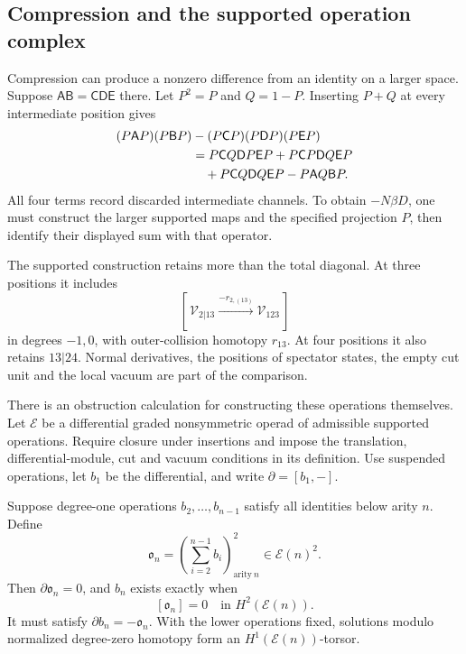 \subsection{Compression and the supported operation complex}
\label{v4-arith:asi:compression}

Compression can produce a nonzero difference from an identity on
a larger space. Suppose
\(\mathsf A\mathsf B=\mathsf C\mathsf D\mathsf E\) there.
Let \(P^2=P\) and \(Q=1-P\). Inserting \(P+Q\) at every
intermediate position gives
\begin{align}
 (P\mathsf AP)(P\mathsf BP)
 &-(P\mathsf CP)(P\mathsf DP)(P\mathsf EP)\notag\\
 &=P\mathsf CQ\mathsf DP\mathsf EP
   +P\mathsf CP\mathsf DQ\mathsf EP\notag\\
 &\quad{}+P\mathsf CQ\mathsf DQ\mathsf EP
   -P\mathsf AQ\mathsf BP.
 \label{v4-arith:asi:discarded-channels}
\end{align}
All four terms record discarded intermediate channels.
To obtain \(-N\beta D\), one must construct the larger supported
maps and the specified projection \(P\), then identify their
displayed sum with that operator.

The supported construction retains more than the total diagonal.
At three positions it includes
\[
 [\,\mathcal V_{2|13}\xrightarrow{-r_{2,(13)}}
                       \mathcal V_{123}\,]
\]
in degrees \(-1,0\), with outer-collision homotopy \(r_{13}\).
At four positions it also retains \(13|24\).
Normal derivatives, the positions of spectator states, the
empty cut unit and the local vacuum are part of the comparison.

There is an obstruction calculation for constructing these
operations themselves. Let \(\mathcal E\) be a differential
graded nonsymmetric operad of admissible supported operations.
Require closure under insertions and impose the translation,
differential-module, cut and vacuum conditions in its definition.
Use suspended operations, let \(b_1\) be the differential, and
write \(\partial=[b_1,-]\).

Suppose degree-one operations \(b_2,\ldots,b_{n-1}\) satisfy all
identities below arity \(n\). Define
\[
 \mathfrak o_n=
 \left(\sum_{i=2}^{n-1}b_i\right)^2_{\mathrm{arity}\ n}
       \in\mathcal E(n)^2.
\]
Then \(\partial\mathfrak o_n=0\), and \(b_n\) exists exactly when
\[
 [\mathfrak o_n]=0\quad\text{in }H^2(\mathcal E(n)).
\]
It must satisfy \(\partial b_n=-\mathfrak o_n\).
With the lower operations fixed, solutions modulo normalized
degree-zero homotopy form an \(H^1(\mathcal E(n))\)-torsor.


